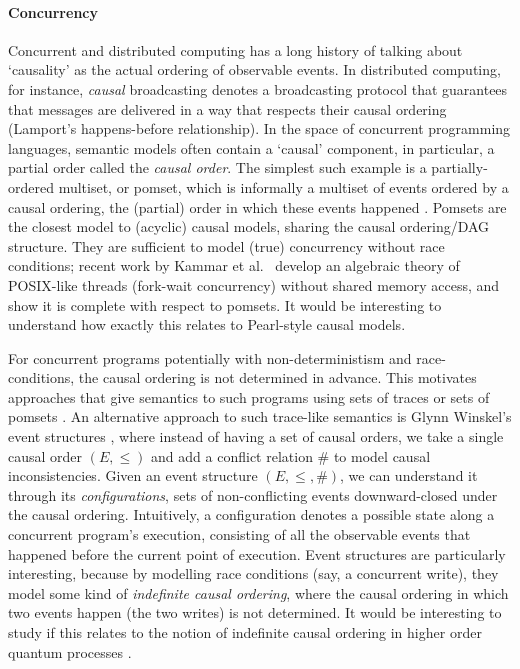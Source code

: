 \documentclass[11pt,a4paper]{article}
\begin{document}
\paragraph{Concurrency} Concurrent and distributed computing has a long history of talking about `causality' as the actual ordering of observable events. In distributed computing, for instance, \emph{causal} broadcasting denotes a broadcasting protocol that guarantees that messages are delivered in a way that respects their causal ordering (Lamport's happens-before relationship). In the space of concurrent programming languages, semantic models often contain a `causal' component, in particular, a partial order called the \emph{causal order}. The simplest such example is a partially-ordered multiset, or pomset, which is informally a multiset of events ordered by a causal ordering, the (partial) order in which these events happened . Pomsets are the closest model to (acyclic) causal models, sharing the causal ordering/DAG structure. They are sufficient to model (true) concurrency without race conditions; recent work by Kammar et al.~\cite{Kammar2026} develop an algebraic theory of POSIX-like threads (fork-wait concurrency) without shared memory access, and show it is complete with respect to pomsets. It would be interesting to understand how exactly this relates to Pearl-style causal models. 

For concurrent programs potentially with non-deterministism and race-conditions, the causal ordering is not determined in advance. This motivates approaches that give semantics to such programs using sets of traces  or sets of pomsets \cite{pratt1986concurrency,vanglabbeek2001concurrency}. An alternative approach to such trace-like semantics is Glynn Winskel's event structures , where instead of having a set of causal orders, we take a single causal order $(E, \leq)$ and add a conflict relation $\#$ to model causal inconsistencies. Given an event structure $(E, \leq, \#)$, we can understand it through its \emph{configurations}, sets of non-conflicting events downward-closed under the causal ordering. Intuitively, a configuration denotes a possible state along a concurrent program's execution, consisting of all the observable events that happened before the current point of execution. Event structures are particularly interesting, because by modelling race conditions (say, a concurrent write), they model some kind of \emph{indefinite causal ordering}, where the causal ordering in which two events happen (the two writes) is not determined. It would be interesting to study if this relates to the notion of indefinite causal ordering in higher order quantum processes .
\end{document}
